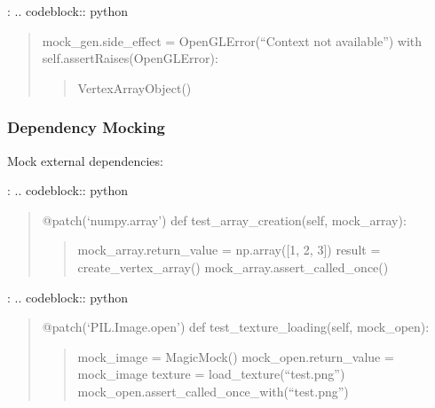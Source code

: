 \documentclass[a4paper,10pt,english,openany,oneside]{sphinxmanual}
\begin{document}
\sphinxAtStartPar
{}:
.. code\sphinxhyphen{}block:: python
\begin{quote}
\begin{description}
\begin{description}
\sphinxAtStartPar
mock\_gen.side\_effect = OpenGLError(“Context not available”)
with self.assertRaises(OpenGLError):
\begin{quote}

\sphinxAtStartPar
VertexArrayObject()
\end{quote}

\end{description}

\end{description}
\end{quote}


\subsubsection{Dependency Mocking}
\label{\detokenize{testing:dependency-mocking}}
\sphinxAtStartPar
Mock external dependencies:

\sphinxAtStartPar
{}:
.. code\sphinxhyphen{}block:: python
\begin{quote}

\sphinxAtStartPar
@patch(‘numpy.array’)
def test\_array\_creation(self, mock\_array):
\begin{quote}

\sphinxAtStartPar
mock\_array.return\_value = np.array({[}1, 2, 3{]})
result = create\_vertex\_array()
mock\_array.assert\_called\_once()
\end{quote}
\end{quote}

\sphinxAtStartPar
{}:
.. code\sphinxhyphen{}block:: python
\begin{quote}

\sphinxAtStartPar
@patch(‘PIL.Image.open’)
def test\_texture\_loading(self, mock\_open):
\begin{quote}

\sphinxAtStartPar
mock\_image = MagicMock()
mock\_open.return\_value = mock\_image
texture = load\_texture(“test.png”)
mock\_open.assert\_called\_once\_with(“test.png”)
\end{quote}
\end{quote}
\end{document}
